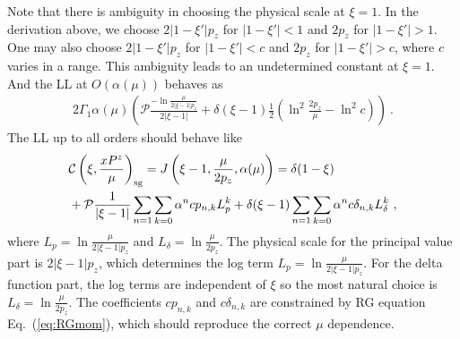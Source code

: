 \documentclass[a4paper,11pt]{article}
\begin{document}
Note that there is ambiguity in choosing the physical scale at $\xi = 1$. In the derivation above, we choose $2|1-\xi'|p_z$ for $|1-\xi'|<1$ and $2p_z$ for $|1-\xi'|>1$. One may also choose $2|1-\xi'|p_z$ for $|1-\xi'|<c$ and $2p_z$ for $|1-\xi'|>c$, where $c$ varies in a range. This ambiguity leads to an undetermined constant at $\xi=1$. And the LL at $O(\alpha(\mu))$ behaves as
\begin{align}\label{eq:mom1loop}
2 \Gamma_{1} \alpha(\mu) \left( \mathcal{P} \frac{-\ln \frac{\mu}{2|\xi-1|p_z}}{2|\xi-1|} + \delta(\xi-1) \frac{1}{2} \left( \ln^2 \frac{2p_z}{\mu} -\ln^2 c \right)\right) \ .
\end{align}
The LL up to all orders should behave like
\begin{align}\label{eq:LLmomallorder}
&{\cal C}\left(\xi,\frac{xP^z}{\mu}\right)_{\rm sg} = J\left(\xi-1, \frac{\mu}{2 p_z}, \alpha(\mu)\right) = \delta(1-\xi) \nonumber\\
&+ \mathcal{P}\frac{1}{|\xi-1|}\sum_{n=1}\sum_{k=0}\alpha^n cp_{n,k} L_p^k + \delta(\xi-1)\sum_{n=1}\sum_{k=0}\alpha^n c\delta_{n,k} L_{\delta}^k \ ,
\end{align}
where $L_p = \ln \frac{\mu}{2|\xi-1|p_z}$ and $L_{\delta} = \ln \frac{\mu}{2p_z}$. The physical scale for the principal value part is $2|\xi-1|p_z$, which determines the log term $L_p=\ln \frac{\mu}{2|\xi-1|p_z}$. For the delta function part, the log terms are independent of $\xi$ so the most natural choice is $L_{\delta} = \ln \frac{\mu}{2p_z}$. The coefficients $cp_{n,k}$ and $c\delta_{n,k}$ are constrained by RG equation Eq.~(\ref{eq:RGmom}), which should reproduce the correct $\mu$ dependence. 
\end{document}
